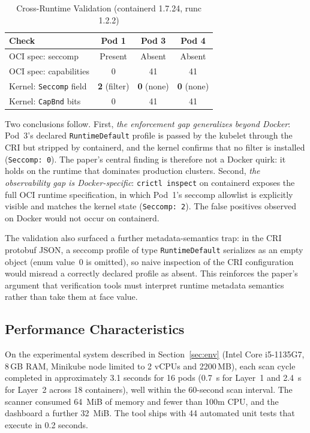 \documentclass[sigconf]{acmart}
\begin{document}
\begin{table}[htbp]
\caption{Cross-Runtime Validation (containerd 1.7.24, runc 1.2.2)}
\label{tab:crossruntime}
\centering
\begin{tabular}{lccc}
\toprule
\textbf{Check} & \textbf{Pod 1} & \textbf{Pod 3} & \textbf{Pod 4} \\
\midrule
OCI spec: seccomp     & Present & Absent & Absent \\
OCI spec: capabilities & 0 & 41 & 41 \\
Kernel: \texttt{Seccomp} field & \textbf{2} (filter) & \textbf{0} (none) & \textbf{0} (none) \\
Kernel: \texttt{CapBnd} bits  & 0 & 41 & 41 \\
\bottomrule
\end{tabular}
\end{table}

Two conclusions follow. First, \emph{the enforcement gap generalizes beyond Docker}: Pod~3's declared \texttt{RuntimeDefault} profile is passed by the kubelet through the CRI but stripped by containerd, and the kernel confirms that no filter is installed (\texttt{Seccomp:~0}). The paper's central finding is therefore not a Docker quirk: it holds on the runtime that dominates production clusters. Second, \emph{the observability gap is Docker-specific}: \texttt{crictl inspect} on containerd exposes the full OCI runtime specification, in which Pod~1's seccomp allowlist is explicitly visible and matches the kernel state (\texttt{Seccomp:~2}). The false positives observed on Docker would not occur on containerd.

The validation also surfaced a further metadata-semantics trap: in the CRI protobuf JSON, a seccomp profile of type \texttt{RuntimeDefault} serializes as an empty object (enum value~0 is omitted), so naive inspection of the CRI configuration would misread a correctly declared profile as absent. This reinforces the paper's argument that verification tools must interpret runtime metadata semantics rather than take them at face value.

\subsection{Performance Characteristics}

On the experimental system described in Section~\ref{sec:env} (Intel Core i5-1135G7, 8\,GB RAM, Minikube node limited to 2 vCPUs and 2200\,MB), each scan cycle completed in approximately 3.1 seconds for 16 pods (0.7~s for Layer~1 and 2.4~s for Layer~2 across 18 containers), well within the 60-second scan interval. The scanner consumed 64~MiB of memory and fewer than 100m CPU, and the dashboard a further 32~MiB. The tool ships with 44 automated unit tests that execute in 0.2 seconds.
\end{document}
